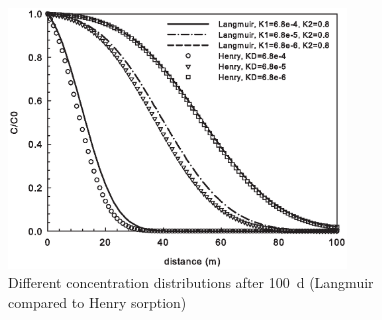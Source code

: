 \begin{figure}[htbp]
\centering
\includegraphics[width=0.8\textwidth]{PART_II/C/fig57.EPS}
\caption{Different concentration distributions after 100~d (Langmuir compared to Henry sorption)}
\label{fig57}
\end{figure}
